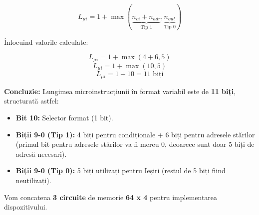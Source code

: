 \[
L_{\mu i} = 1 + \max(\underbrace{n_{ci} + n_{adr}}_{\text{Tip 1}}, \underbrace{n_{out}}_{\text{Tip 0}})
\]

Înlocuind valorile calculate:

\[
L_{\mu i} = 1 + \max(4 + 6, 5)
\]
\[
L_{\mu i} = 1 + \max(10, 5)
\]
\[
L_{\mu i} = 1 + 10 = 11 \text{ biți}
\]

\textbf{Concluzie:} Lungimea microinstrucțiunii în format variabil este de \textbf{11 biți}, structurată astfel:
\begin{itemize}
    \item \textbf{Bit 10:} Selector format (1 bit).
    \item \textbf{Biții 9-0 (Tip 1):} 4 biți pentru condiționale + 6 biți pentru adresele stărilor (primul bit pentru adresele stărilor va fi mereu 0, deoarece sunt doar 5 biți de adresă necesari).
    \item \textbf{Biții 9-0 (Tip 0):} 5 biți utilizați pentru Ieșiri (restul de 5 biți fiind neutilizați).
\end{itemize}

  Vom concatena \textbf{3 circuite} de memorie \textbf{64 x 4} pentru implementarea dispozitivului.
